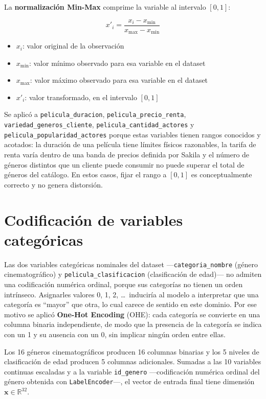 \documentclass[12pt, a4paper]{report}
\newcommand{\variable}[1]{\texttt{\small #1}}
\begin{document}
La \textbf{normalización Min-Max} comprime la variable al intervalo $[0, 1]$:

\[
  x'_i = \frac{x_i - x_{\min}}{x_{\max} - x_{\min}}
\]

\begin{itemize}
  \item $x_i$: valor original de la observación
  \item $x_{\min}$: valor mínimo observado para esa variable en el dataset
  \item $x_{\max}$: valor máximo observado para esa variable en el dataset
  \item $x'_i$: valor transformado, en el intervalo $[0, 1]$
\end{itemize}

Se aplicó a \variable{pelicula\_duracion}, \variable{pelicula\_precio\_renta}, \variable{variedad\_generos\_cliente}, \variable{pelicula\_cantidad\_actores} y \variable{pelicula\_popularidad\_actores} porque estas variables tienen rangos conocidos y acotados: la duración de una película tiene límites físicos razonables, la tarifa de renta varía dentro de una banda de precios definida por Sakila y el número de géneros distintos que un cliente puede consumir no puede superar el total de géneros del catálogo. En estos casos, fijar el rango a $[0, 1]$ es conceptualmente correcto y no genera distorsión.

\section{Codificación de variables categóricas}

Las dos variables categóricas nominales del dataset ---\variable{categoria\_nombre} (género cinematográfico) y \variable{pelicula\_clasificacion} (clasificación de edad)--- no admiten una codificación numérica ordinal, porque sus categorías no tienen un orden intrínseco. Asignarles valores 0, 1, 2, \ldots\ induciría al modelo a interpretar que una categoría es ``mayor'' que otra, lo cual carece de sentido en este dominio. Por ese motivo se aplicó \textbf{One-Hot Encoding} (OHE): cada categoría se convierte en una columna binaria independiente, de modo que la presencia de la categoría se indica con un 1 y su ausencia con un 0, sin implicar ningún orden entre ellas.

Los 16 géneros cinematográficos producen 16 columnas binarias y los 5 niveles de clasificación de edad producen 5 columnas adicionales. Sumadas a las 10 variables continuas escaladas y a la variable \variable{id\_genero} ---codificación numérica ordinal del género obtenida con \texttt{LabelEncoder}---, el vector de entrada final tiene dimensión $\mathbf{x} \in \mathbb{R}^{32}$.
\end{document}
